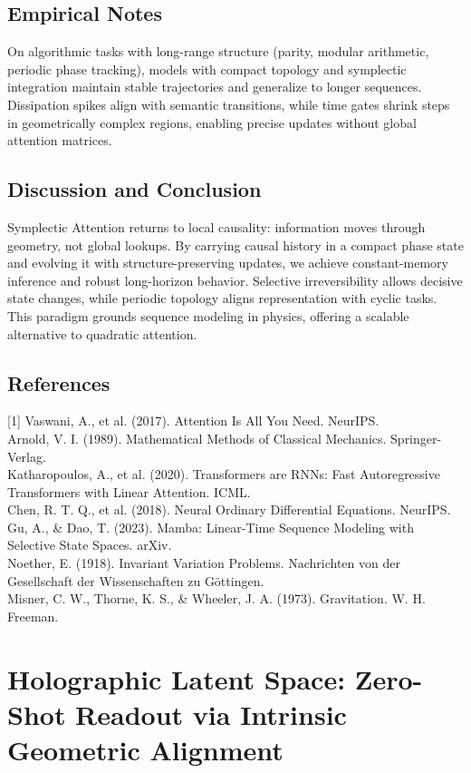 \documentclass{article}
\numberwithin{equation}{section}
\begin{document}
\subsection{Empirical Notes}
On algorithmic tasks with long-range structure (parity, modular arithmetic, periodic phase tracking), models with compact topology and symplectic integration maintain stable trajectories and generalize to longer sequences. Dissipation spikes align with semantic transitions, while time gates shrink steps in geometrically complex regions, enabling precise updates without global attention matrices.

\subsection{Discussion and Conclusion}
Symplectic Attention returns to local causality: information moves through geometry, not global lookups. By carrying causal history in a compact phase state and evolving it with structure-preserving updates, we achieve constant-memory inference and robust long-horizon behavior. Selective irreversibility allows decisive state changes, while periodic topology aligns representation with cyclic tasks. This paradigm grounds sequence modeling in physics, offering a scalable alternative to quadratic attention.

\subsection*{References}
[1] Vaswani, A., et al. (2017). Attention Is All You Need. NeurIPS.\\
[2] Arnold, V. I. (1989). Mathematical Methods of Classical Mechanics. Springer-Verlag.\\
[3] Katharopoulos, A., et al. (2020). Transformers are RNNs: Fast Autoregressive Transformers with Linear Attention. ICML.\\
[4] Chen, R. T. Q., et al. (2018). Neural Ordinary Differential Equations. NeurIPS.\\
[5] Gu, A., \& Dao, T. (2023). Mamba: Linear-Time Sequence Modeling with Selective State Spaces. arXiv.\\
[6] Noether, E. (1918). Invariant Variation Problems. Nachrichten von der Gesellschaft der Wissenschaften zu Göttingen.\\
[7] Misner, C. W., Thorne, K. S., \& Wheeler, J. A. (1973). Gravitation. W. H. Freeman.

\section{Holographic Latent Space: Zero-Shot Readout via Intrinsic Geometric Alignment}
\end{document}
